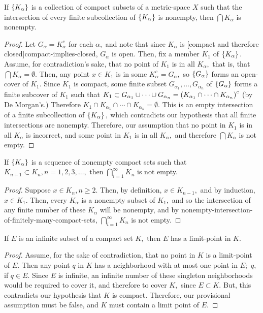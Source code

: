 \documentclass{article}
\begin{document}
\begin{theorem}\label{nonempty-intersection-of-finitely-many-compact-sets}
If $\left\{ K_\alpha \right\}$ is a \@{collection} of \@{compact} subsets of a \@{metric-space} $X$ such that the intersection of every finite subcollection of $\left\{ K_\alpha \right\}$ is nonempty, then $\bigcap K_\alpha$ is nonempty.
\end{theorem}
\begin{proof}
Let $G_\alpha = K_\alpha^c$ for each $\alpha,$ and note that since $K_\alpha$ is \@[compact and therefore closed]{compact-implies-closed}, $G_\alpha$ is \@{open}. Then, fix a member $K_1$ of $\left\{ K_\alpha \right\}.$ Assume, for contradiction's sake, that no point of $K_1$ is in all $K_\alpha,$ that is, that $\bigcap K_\alpha = \emptyset.$ Then, any point $x \in K_1$ is in some $K_\alpha^c = G_\alpha,$ so $\left\{ G_\alpha \right\}$ forms an \@{open-cover} of $K_1.$ Since $K_1$ is compact, some finite subset $G_{\alpha_1}, \dots, G_{\alpha_n}$ of $\left\{ G_\alpha \right\}$ forms a finite subcover of $K_1$ such that $K_1 \subset G_{\alpha_1} \cup \cdots \cup G_{\alpha_n} = \left(K_{\alpha_1} \cap \cdots \cap K_{\alpha_n}\right)^c$ (by De Morgan's.) Therefore $K_1 \cap K_{\alpha_1} \cap \cdots \cap K_{\alpha_n} = \emptyset.$ This is an empty intersection of a finite subcollection of $\left\{ K_\alpha \right\},$ which contradicts our hypothesis that all finite intersections are nonempty. Therefore, our assumption that no point in $K_1$ is in all $K_\alpha$ is incorrect, and some point in $K_1$ is in all $K_\alpha,$ and therefore $\bigcap K_\alpha$ is not empty.
\end{proof}
\begin{corollary}\label{intersection-of-nonempty-nested-compact-sets-is-nonempty}
If $\left\{ K_\alpha \right\}$ is a \@{sequence} of nonempty \@{compact} sets such that $K_{n+1} \subset K_n, n = 1, 2, 3, \dots,$ then $\bigcap_{i=1}^\infty K_n$ is not empty.
\end{corollary}
\begin{proof}
Suppose $x \in K_n, n \geq 2.$ Then, by definition, $x \in K_{n-1},$ and by induction, $x \in K_1.$ Then, every $K_\alpha$ is a nonempty subset of $K_1,$ and so the intersection of any finite number of these $K_\alpha$ will be nonempty, and by \@{nonempty-intersection-of-finitely-many-compact-sets}, $\bigcap_{i=1}^\infty K_n$ is not empty.
\end{proof}

\begin{theorem}\label{infinite-subset-of-compact-set-has-limit-point}
If $E$ is an \@{infinite} subset of a \@{compact} set $K,$ then $E$ has a \@{limit-point} in $K.$
\end{theorem}
\begin{proof}
Assume, for the sake of contradiction, that no point in $K$ is a \@{limit-point} of $E.$ Then any point $q$ in $K$ has a \@{neighborhood} with at most one point in $E;$ $q,$ if $q \in E.$ Since $E$ is \@{infinite}, an infinite number of these singleton neighborhoods would be required to cover it, and therefore to cover $K,$ since $E \subset K.$ But, this contradicts our hypothesis that $K$ is \@{compact}. Therefore, our provisional assumption must be false, and $K$ must contain a limit point of $E.$
\end{proof}
\end{document}
